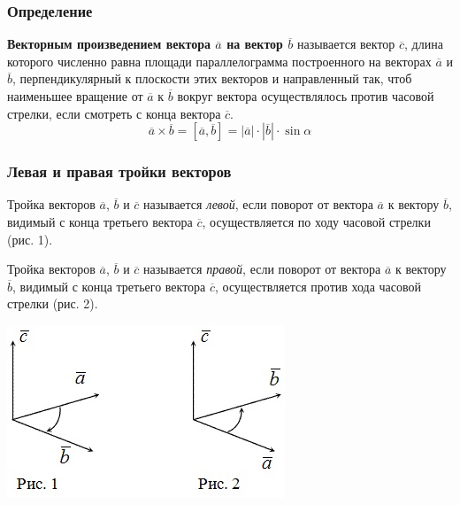 \documentclass{article}
\begin{document}
\subsubsection{Определение}
\textbf{Векторным произведением вектора $\overline{a}$ на вектор $\overline{b}$} называется вектор $\overline{c}$, длина которого
численно равна площади параллелограмма построенного на векторах $\overline{a}$ и $\overline{b}$,
перпендикулярный к плоскости этих векторов и направленный так, чтоб наименьшее
вращение от $\overline{a}$ к $\overline{b}$ вокруг вектора осуществлялось против часовой стрелки, если
смотреть с конца вектора $\overline{c}$.
$$\overline{a}\times\overline{b}=[\overline{a},\overline{b}]=|\overline{a}|\cdot|\overline{b}|\cdot\sin\alpha$$
\subsubsection{Левая и правая тройки векторов}
Тройка векторов $\overline{a}$, $\overline{b}$ и  $\overline{c}$ называется \textit{левой}, если поворот от вектора $\overline{a}$ к вектору $\overline{b}$,
видимый с конца третьего вектора $\overline{c}$, осуществляется по ходу часовой стрелки (рис. 1).

Тройка векторов $\overline{a}$, $\overline{b}$ и  $\overline{c}$ называется \textit{правой}, если поворот от вектора $\overline{a}$ к вектору $\overline{b}$,
видимый с конца третьего вектора $\overline{c}$, осуществляется против хода часовой стрелки (рис. 2).
\begin{center}
\includegraphics[scale=1.2]{lalala.jpg}
\end{center}
\end{document}
